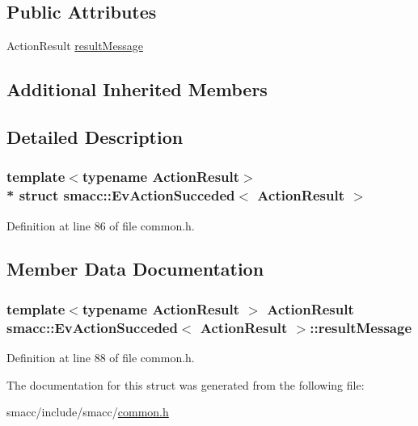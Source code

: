\subsection*{Public Attributes}
\begin{DoxyCompactItemize}
\item 
Action\+Result \hyperlink{structsmacc_1_1EvActionSucceded_a888fea00e22fd7677c1f70dd0882a06f}{result\+Message}
\end{DoxyCompactItemize}
\subsection*{Additional Inherited Members}


\subsection{Detailed Description}
\subsubsection*{template$<$typename Action\+Result$>$\\*
struct smacc\+::\+Ev\+Action\+Succeded$<$ Action\+Result $>$}



Definition at line 86 of file common.\+h.



\subsection{Member Data Documentation}
\subsubsection[{\texorpdfstring{result\+Message}{resultMessage}}]{\setlength{\rightskip}{0pt plus 5cm}template$<$typename Action\+Result $>$ Action\+Result {\bf smacc\+::\+Ev\+Action\+Succeded}$<$ Action\+Result $>$\+::result\+Message}\hypertarget{structsmacc_1_1EvActionSucceded_a888fea00e22fd7677c1f70dd0882a06f}{}\label{structsmacc_1_1EvActionSucceded_a888fea00e22fd7677c1f70dd0882a06f}


Definition at line 88 of file common.\+h.



The documentation for this struct was generated from the following file\+:\begin{DoxyCompactItemize}
\item 
smacc/include/smacc/\hyperlink{common_8h}{common.\+h}\end{DoxyCompactItemize}
